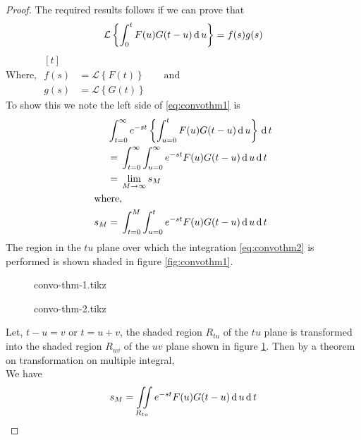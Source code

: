 \documentclass[12pt,class=book,crop=false]{standalone}
\newcommand{\lap}[1]{\mathcal{L}\left\{ #1\right\}}
\begin{document}
\begin{proof}
    The required results follows if we can prove that
    \begin{equation}
        \lap{\int_0^t F(u) G(t-u)\D u}=f(s)g(s)\label{eq:convothm1}
    \end{equation}
    Where, $ \begin{aligned}[t]
                 &                             \\
            f(s) & =\lap{F(t)}\qquad\text{and} \\
            g(s) & =\lap{G(t)}
        \end{aligned} $\\
    To show this we note the left side of \eqref{eq:convothm1} is
    \begin{align}
            & \int_{t=0}^\infty e^{-st}\left\{ \int_{u=0}^t F(u)G(t-u)\,\mathrm{d}\, u \right\}\,\mathrm{d}\, t\notag \\
            & =\, \int_{t=0}^\infty \int_{u=0}^\infty e^{-st} F(u)G(t-u)\,\mathrm{d}\, u \,\mathrm{d}\, t\notag       \\
            & =\, \lim_{M\to \infty} s_M\notag                                                \\
        \intertext{where,}
        s_M & =\, \int_{t=0}^M \int_{u=0}^t e^{-st} F(u)G(t-u)\,\mathrm{d}\, u \,\mathrm{d}\, t\label{eq:convothm2}
    \end{align}
    The region in the $ tu $ plane over which the integration \eqref{eq:convothm2} is performed is shown shaded in figure \ref{fig:convothm1}.
    \begin{figure}[H]
        \begin{minipage}[b]{0.5\textwidth}
            \centering
            {convo-thm-1.tikz}
            \caption{}
            \label{fig:convothm1}
        \end{minipage}
        \begin{minipage}[b]{0.5\textwidth}
            \centering
            {convo-thm-2.tikz}
            \caption{}
            \label{fig:convothm2}
        \end{minipage}
    \end{figure}
    Let, $ t-u=v $ or $ t=u+v $, the shaded region $ R_{tu} $ of the $ tu $ plane is transformed into the shaded region $ R_{uv} $ of the $ uv  $ plane shown in figure \ref{fig:convothm2}. Then by a theorem on transformation on multiple integral,\\ We have
    \begin{align}
        s_M & =\iint\limits_{R_{tu}} e^{-st}F(u)G(t-u)\D u\D t\notag                                                            \\

\end{align}
\end{proof}
\end{document}
